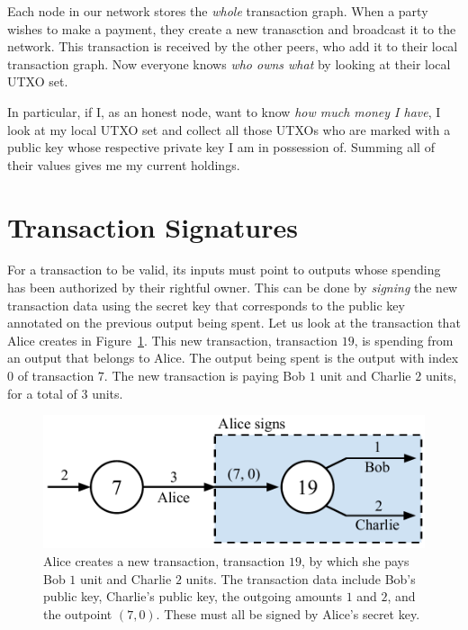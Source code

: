 Each node in our network stores the \emph{whole} transaction graph. When a party wishes to make
a payment, they create a new tranasction and broadcast it to the network. This transaction is
received by the other peers, who add it to their local transaction graph. Now everyone
knows \emph{who owns what} by looking at their local UTXO set.

In particular, if I, as an honest node, want to know \emph{how much money I have}, I look
at my local UTXO set and collect all those UTXOs who are marked with a public key whose
respective private key I am in possession of. Summing all of their values gives me my
current holdings.

\section{Transaction Signatures}

For a transaction to be valid, its inputs must point to outputs whose spending has
been authorized by their rightful owner. This can be done by \emph{signing} the new transaction
data using the secret key that corresponds to the public key annotated on the previous output
being spent.
Let us look at the transaction that Alice creates in Figure~\ref{fig.utxo-sig}. This
new transaction, transaction $19$, is spending from an output that belongs to Alice.
The output being spent is the output with index $0$ of transaction $7$.
The new transaction is paying Bob $1$ unit and Charlie $2$ units, for a total of
$3$ units.

\begin{figure}[h]
  \centering
  \includegraphics[width=0.65 \columnwidth,keepaspectratio]{figures/utxo-sig.pdf}
  \caption{Alice creates a new transaction, transaction $19$, by which she pays Bob
           $1$ unit
           and Charlie $2$ units.
           The transaction data include Bob's public key, Charlie's public key,
           the outgoing amounts $1$ and $2$, and the outpoint $(7, 0)$.
           These must all be signed by Alice's secret key.}
  \label{fig.utxo-sig}
\end{figure}

